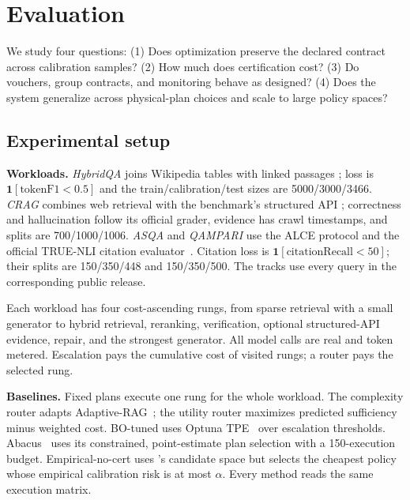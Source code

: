 \section{Evaluation}
\label{sec:experiments}

We study four questions: (1) Does optimization preserve the declared
contract across calibration samples? (2) How much does certification cost?
(3) Do vouchers, group contracts, and monitoring behave as designed?
(4) Does the system generalize across physical-plan choices and scale to
large policy spaces?

\subsection{Experimental setup}
\label{sec:exp-setup}

\textbf{Workloads.}
\emph{HybridQA} joins Wikipedia tables with linked passages
\cite{chen2020hybridqa}; loss is
$\mathbf{1}[\mathrm{tokenF1}<0.5]$ and the train/calibration/test sizes are
5000/3000/3466.
\emph{CRAG} combines web retrieval with the benchmark's structured API
\cite{yang2024cragbench}; correctness and hallucination follow its official
grader, evidence has crawl timestamps, and splits are 700/1000/1006.
\emph{ASQA} and \emph{QAMPARI} use the ALCE protocol
\cite{stelmakh2022asqa,amouyal2022qampari,gao2023alce} and the official
TRUE-NLI citation evaluator~\cite{honovich2022true}. Citation loss is
$\mathbf{1}[\mathrm{citationRecall}<50]$; their splits are 150/350/448 and
150/350/500. The tracks use every query in the corresponding public
release.

Each workload has four cost-ascending rungs, from sparse retrieval with a
small generator to hybrid retrieval, reranking, verification, optional
structured-API evidence, repair, and the strongest generator. All model
calls are real and token metered. Escalation pays the cumulative cost of
visited rungs; a router pays the selected rung.

\textbf{Baselines.} Fixed plans execute one rung for the whole workload.
The complexity router adapts Adaptive-RAG~\cite{jeong2024adaptiverag}; the
utility router maximizes predicted sufficiency minus weighted cost.
BO-tuned uses Optuna TPE~\cite{akiba2019optuna} over escalation thresholds.
Abacus~\cite{russo2025abacus} uses its constrained, point-estimate plan
selection with a 150-execution budget. Empirical-no-cert uses \system's
candidate space but selects the cheapest policy whose empirical
calibration risk is at most $\alpha$. Every method reads the same execution
matrix.

